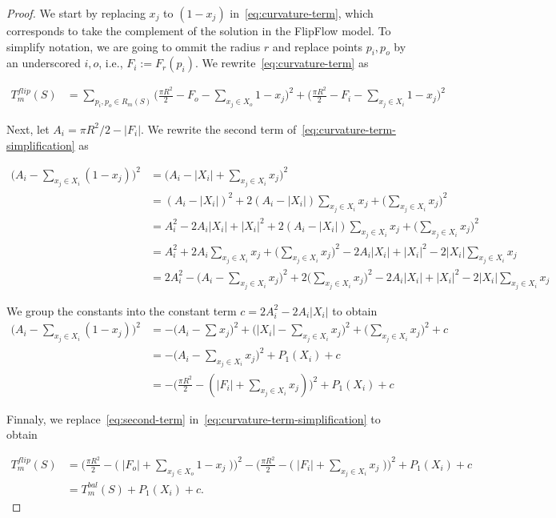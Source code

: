 \begin{proof}

We start by replacing $x_j$ to $(1-x_j)$ in~\cref{eq:curvature-term}, which corresponds to take the complement of the solution in the FlipFlow model. To simplify notation, we are going to ommit the radius $r$ and replace points $p_i,p_o$ by an underscored $i,o$, i.e., $F_i := F_r(p_i)$. We rewrite~\cref{eq:curvature-term} as

\begin{align}
T_{m}^{flip}(S) &= \sum_{ p_i,p_o \in R_m(S)}{ \Big( \frac{\pi R^2}{2} - F_o - \sum_{x_j \in X_o}{1-x_j}\Big)^2 + \Big(\frac{\pi R^2}{2} - F_i - \sum_{x_j \in X_i}{1-x_j}\Big)^2 }
\label{eq:curvature-term-simplification}
\end{align}

Next, let $A_i = \pi R^2/2 - |F_i|$. We rewrite  the second term of~\cref{eq:curvature-term-simplification} as

\begin{align*}
	\Big(A_i - \sum_{x_j \in X_i}{ (1-x_j) } \Big)^2 &= \Big( A_i - |X_i| + \sum_{x_j \in X_i}{ x_j } \Big)^2 \\
	&= (A_i - |X_i|)^2 + 2(A_i - |X_i|)\sum_{x_j \in X_i}{x_j} + \Big( \sum_{x_j \in X_i}{x_j} \Big)^2\\	
	&= A_i^2 -2A_i|X_i| + |X_i|^2 + 2(A_i - |X_i|)\sum_{x_j \in X_i}{x_j} + \Big( \sum_{x_j \in X_i}{x_j} \Big)^2\\
	&= A_i^2 + 2A_i\sum_{x_j \in X_i}{x_j} + \Big( \sum_{x_j \in X_i}{x_j} \Big)^2 - 2A_i|X_i| + |X_i|^2 -2|X_i|\sum_{x_j \in X_i}{x_j} \\
	&= 2A_i^2 - \Big(A_i - \sum_{x_j \in X_i}{x_j}\Big)^2 + 2\Big( \sum_{x_j \in X_i}{x_j} \Big) ^2 - 2A_i|X_i| + |X_i|^2 - 2|X_i|\sum_{x_j \in X_i}{x_j}
\end{align*}

	We group the constants into the constant term $c=2A_i^2 - 2A_i|X_i|$	 to obtain
\begin{align}
		\Big(A_i - \sum_{x_j \in X_i}{ (1-x_j) }\Big)^2 &= - \Big(A_i - \sum_{}{x_j}\Big)^2 + \Big(|X_i| - \sum_{x_j \in X_i}{x_j}\Big)^2 + \Big(\sum_{x_j \in X_i}{x_j}\Big)^2 + c \nonumber \\
	&= - \Big(A_i - \sum_{x_j \in X_i}{x_j}\Big)^2 + P_1(X_i) + c \nonumber \\
	&= - \Big(\frac{\pi R^2}{2} - (|F_i| + \sum_{x_j \in X_i}{x_j}) \Big)^2 + P_1(X_i) + c \nonumber 	
	\label{eq:second-term}
\end{align}

Finnaly, we  replace~\cref{eq:second-term} in~\cref{eq:curvature-term-simplification} to obtain

\begin{align}
T_{m}^{flip}(S) &= \Bigg( \frac{\pi R^2}{2} - \Big(\; |F_o| + \sum_{ x_j \in X_o}{1-x_j} \; \Big) \Bigg)^2 - \Bigg(\frac{\pi R^2}{2} - \Big(\; |F_i| + \sum_{x_j \in X_i}{x_j}\;\Big) \Bigg)^2  + P_1(X_i) + c \nonumber \\
&= T_{m}^{bal}(S) + P_1(X_i) + c.
\end{align}

\end{proof}

